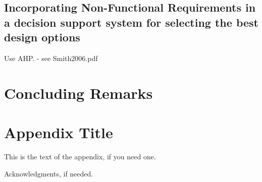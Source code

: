 \documentclass[10pt, preprint]{sigplanconf}
\begin{document}
\subsection{Incorporating Non-Functional Requirements in a decision support system for selecting the best design options}
\label{subsec:incorporating}

Use AHP. - see Smith2006.pdf

\section{Concluding Remarks}
\label{sec:concluding}

\appendix
\section{Appendix Title}

This is the text of the appendix, if you need one.

\acks

Acknowledgments, if needed.





\begin{thebibliography}{}
\softraggedright


\end{thebibliography}
\end{document}
